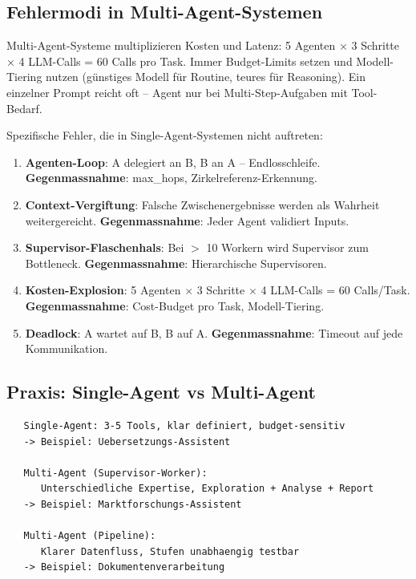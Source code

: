 \subsection{Fehlermodi in Multi-Agent-Systemen}

\begin{praxishinweis}
Multi-Agent-Systeme multiplizieren Kosten und Latenz: 5 Agenten × 3 Schritte × 4 LLM-Calls = 60 Calls pro Task. Immer Budget-Limits setzen und Modell-Tiering nutzen (günstiges Modell für Routine, teures für Reasoning). Ein einzelner Prompt reicht oft -- Agent nur bei Multi-Step-Aufgaben mit Tool-Bedarf.
\end{praxishinweis}

Spezifische Fehler, die in Single-Agent-Systemen nicht auftreten:

\begin{enumerate}[leftmargin=*]
    \item \textbf{Agenten-Loop}: A delegiert an B, B an A -- Endlosschleife. \textbf{Gegenmassnahme}: max\_hops, Zirkelreferenz-Erkennung.
    \item \textbf{Context-Vergiftung}: Falsche Zwischenergebnisse werden als Wahrheit weitergereicht. \textbf{Gegenmassnahme}: Jeder Agent validiert Inputs.
    \item \textbf{Supervisor-Flaschenhals}: Bei $>$ 10 Workern wird Supervisor zum Bottleneck. \textbf{Gegenmassnahme}: Hierarchische Supervisoren.
    \item \textbf{Kosten-Explosion}: 5 Agenten $\times$ 3 Schritte $\times$ 4 LLM-Calls = 60 Calls/Task. \textbf{Gegenmassnahme}: Cost-Budget pro Task, Modell-Tiering.
    \item \textbf{Deadlock}: A wartet auf B, B auf A. \textbf{Gegenmassnahme}: Timeout auf jede Kommunikation.
\end{enumerate}

\subsection{Praxis: Single-Agent vs Multi-Agent}

\begin{verbatim}
   Single-Agent: 3-5 Tools, klar definiert, budget-sensitiv
   -> Beispiel: Uebersetzungs-Assistent

   Multi-Agent (Supervisor-Worker):
      Unterschiedliche Expertise, Exploration + Analyse + Report
   -> Beispiel: Marktforschungs-Assistent

   Multi-Agent (Pipeline):
      Klarer Datenfluss, Stufen unabhaengig testbar
   -> Beispiel: Dokumentenverarbeitung
\end{verbatim}

